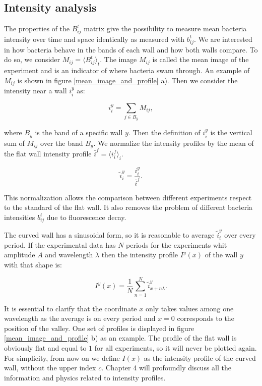 \subsection{Intensity analysis}

The properties of the $B_{ij}^t$ matrix give the possibility to measure mean bacteria intensity over time and space identically as measured with $ b_{ij}^t$. We are interested in how bacteria behave in the bands of each wall and how both walls compare. To do so, we consider $M_{ij} = \langle B_{ij}^t \rangle_t $. The image $M_{ij}$ is called the mean image of the experiment and is an indicator of where bacteria swam through. An example of $M_{ij}$ is shown in figure \ref{mean_image_and_profile} a). Then we consider the intensity near a wall $i_i^y$ as:

\begin{equation}
	i_i^y = \sum_{j \in B_y} M_{ij},
\end{equation}

where $B_y$ is the band of a specific wall $y$. Then the definition of $i_i^y$ is the vertical sum of $M_{ij}$ over the band $B_y$. We normalize the intensity profiles by the mean of the flat wall intensity profile $\bar{i}^f = \langle  i_i^f\rangle_i $. 

\begin{equation}  
	\tilde{i}_i^y = \frac{i_i^y}{\bar{i}^f}.
\end{equation}

This normalization allows the comparison between different experiments respect to the standard of the flat wall. It also removes the problem of different bacteria intensities $b_{ij}^t$ due to fluorescence decay. 

The curved wall has a sinusoidal form, so it is reasonable to average $\tilde{i}_i^y$ over every period. If the experimental data has $N$ periods for the experiments whit amplitude $A$ and wavelength $\lambda$ then the intensity profile $I^y(x)$ of the wall $y$ with that shape is:

\begin{equation} \label{eq:Intensity profile}
	I^y(x) = \frac{1}{N} \sum_{n=1}^N \tilde{i}_{x+ n\lambda}^y.
\end{equation}

It is essential to clarify that the coordinate $x$ only takes values among one wavelength as the average is on every period and $x=0$ corresponds to the position of the valley. One set of profiles is displayed in figure \ref{mean_image_and_profile} b) as an example. The profile of the flat wall is obviously flat and equal to $1$ for all experiments, so it will never be plotted again. For simplicity, from now on we define $I(x)$ as the intensity profile of the curved wall, without the upper index $c$. Chapter 4 will profoundly discuss all the information and physics related to intensity profiles.


